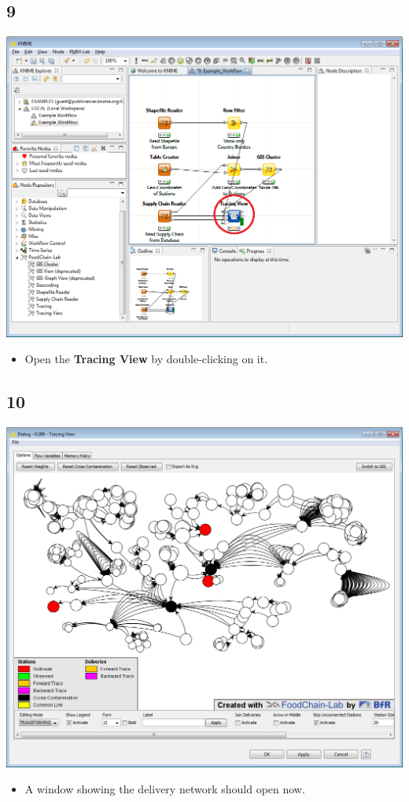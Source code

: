 \documentclass{beamer}
\begin{document}
\subsection{9}
\begin{frame}
	\begin{center}
  		\includegraphics[height=0.6\textheight]{9.png}
	\end{center}
	\begin{itemize}
		\item Open the \textbf{Tracing View} by double-clicking on it.
	\end{itemize}
\end{frame}

\subsection{10}
\begin{frame}
	\begin{center}
  		\includegraphics[height=0.6\textheight]{10.png}
	\end{center}
	\begin{itemize}
		\item A window showing the delivery network should open now.
	\end{itemize}
\end{frame}
\end{document}
